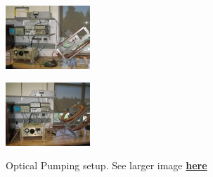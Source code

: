 \documentclass{../lab}
\begin{document}
\begin{figure}[h]
\begin{minipage}{0.36\textwidth}
    \href{http://experimentationlab.berkeley.edu/sites/default/files/images/OPT_3524.jpg}{\includegraphics[width=\linewidth,keepaspectratio]{images/OPT_3524.jpg}}
    \caption{Optical Pumping setup. See larger image \href{http://experimentationlab.berkeley.edu/sites/default/files/images/OPT_3524.jpg}{\textbf{here}}}
\end{minipage}
\begin{minipage}{0.36\textwidth}
    \href{http://experimentationlab.berkeley.edu/sites/default/files/images/OPT_3548.jpg}{\includegraphics[width=\linewidth,keepaspectratio]{images/OPT_3548.jpg}}

\end{minipage}
\end{figure}
\end{document}
